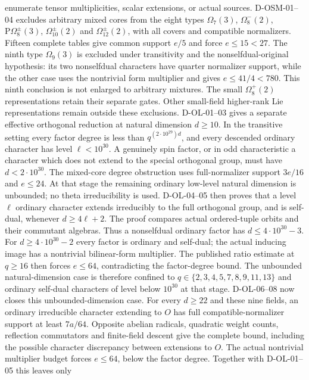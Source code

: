 \documentclass[11pt]{article}
\theoremstyle{remark}\newtheorem{remark}[theorem]{Remark}
\begin{document}
enumerate tensor multiplicities, scalar extensions, or actual sources.
D-OSM-01--04 excludes arbitrary mixed cores from the eight types
$\Omega_7(3)$, $\Omega_8^-(2)$, $\mathrm{P}\Omega_8^\pm(3)$,
$\Omega_{10}^\pm(2)$ and $\Omega_{12}^\pm(2)$, with all covers and
compatible normalizers. Fifteen complete tables give common support
$e/5$ and force $e\le15<27$. The ninth type $\Omega_9(3)$ is
excluded under transitivity and the nonselfdual-original hypothesis:
its two nonselfdual characters have quarter normalizer support, while
the other case uses the nontrivial form multiplier and gives
$e\le41/4<780$. This ninth conclusion is not enlarged to arbitrary
mixtures. The small $\Omega_8^+(2)$ representations retain their
separate gates. Other small-field higher-rank Lie representations
remain outside these exclusions.
D-OL-01--03 gives a separate effective orthogonal reduction at natural
dimension $d\ge10$. In the transitive setting every factor degree is
less than $q^{(2\cdot10^{29})d}$, and every descended ordinary character
has level $\ell<10^{30}$. A genuinely spin factor, or in odd
characteristic a character which does not extend to the special
orthogonal group, must have $d<2\cdot10^{30}$. The mixed-core
degree obstruction uses full-normalizer support $3e/16$ and $e\le24$.
At that stage the remaining ordinary low-level natural dimension is unbounded;
no theta irreducibility is used. D-OL-04--05 then proves that a level
$\ell$ ordinary character extends irreducibly to the full orthogonal
group, and is self-dual, whenever $d\ge4\ell+2$. The proof compares
actual ordered-tuple orbits and their commutant algebras.
Thus a nonselfdual ordinary factor has $d\le4\cdot10^{30}-3$.
For $d\ge4\cdot10^{30}-2$ every factor is ordinary and self-dual;
the actual inducing image has a nontrivial bilinear-form multiplier.
The published ratio estimate at $q\ge16$ then forces $e\le64$,
contradicting the factor-degree bound. The unbounded natural-dimension
case is therefore confined to $q\in\{2,3,4,5,7,8,9,11,13\}$ and
ordinary self-dual characters of level below $10^{30}$ at that stage.
D-OL-06--08 now closes this unbounded-dimension case. For every
$d\ge22$ and these nine fields, an ordinary irreducible character
extending to $O$ has full compatible-normalizer support at least
$7a/64$. Opposite abelian radicals, quadratic weight counts, reflection
commutators and finite-field descent give the complete bound, including
the possible character discrepancy between extensions to $O$.
The actual nontrivial multiplier budget forces $e\le64$, below the
factor degree. Together with D-OL-01--05 this leaves only
\end{document}
